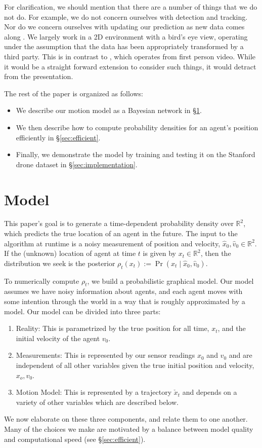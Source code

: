 \documentclass[letterpaper,10pt,conference]{ieeeconf}
\begin{document}
For clarification, we should mention that there are a number of things that we do not do.
For example, we do not concern ourselves with detection and tracking. 
Nor do we concern ourselves with updating our prediction as new data comes along \cite{Kitani2012}.
We largely work in a 2D environment with a bird's eye view, operating under the assumption that the data has been appropriately transformed by a third party.
This is in contrast to \cite{Karasev2016}, which operates from first person video.
While it would be a straight forward extension to consider such things, it would detract from the presentation.

The rest of the paper is organized as follows:
\begin{itemize}
	\item We describe our motion model as a Bayesian network  in \S \ref{sec:model}.
	\item We then describe how to compute probability densities for an agent's position efficiently  in \S \ref{sec:efficient}.
	\item Finally, we demonstrate the model by training and testing it on the Stanford drone dataset \cite{Robicquet2016} in \S \ref{sec:implementation}.
\end{itemize}

\section{Model}\label{sec:model}
This paper's goal is to generate a time-dependent probability density over $\mathbb{R}^2$, which predicts the true location of an agent in the future.
The input to the algorithm at runtime is a noisy measurement of position and velocity, $\hat{x}_0, \hat{v}_0 \in \mathbb{R}^2$.
If the (unknown) location of agent at time $t$ is given by $x_t \in \mathbb{R}^2$, then the distribution we seek is the posterior $\rho_t(x_t) := \Pr( x_t \mid \hat{x}_0, \hat{v}_0 )$.

To numerically compute $\rho_t$, we build a probabilistic graphical model.
Our model assumes we have noisy information about agents, and each agent moves with some intention through the world in a way that is roughly approximated by a model.
Our model can be divided into three parts:
\begin{enumerate}
	\item Reality: This is parametrized by the true position for all time, $x_t$, and the initial velocity of the agent $v_0$.
	\item Measurements:  This is represented by our sensor readings $\hat{x}_0$ and $\hat{v}_0$ and are independent of all other variables given the true initial position and velocity, $x_o, v_0$.
	\item Motion Model: This is represented by a trajectory $\check{x}_t$ and depends on a variety of other variables which are described below.
\end{enumerate}
We now elaborate on these three components, and relate them to one another.
Many of the choices we make are motivated by a balance between model quality and computational speed (see \S \ref{sec:efficient}).
\end{document}
